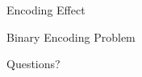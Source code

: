 \documentclass[10pt]{beamer}
\begin{document}
\begin{frame}[fragile]{Encoding Effect}
    \begin{center}
        
    \end{center}
\end{frame}




\begin{frame}[fragile]{Binary Encoding Problem}
    \begin{center}
    
    \end{center}
\end{frame}






{
\begin{frame}[standout]
  Questions?
\end{frame}
}
\end{document}
